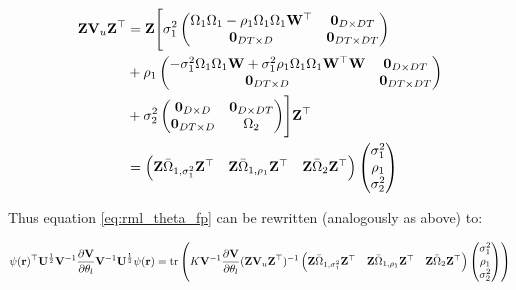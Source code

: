 \begin{align*}
\mathbf{Z}\mathbf{V}_u\mathbf{Z}^\top
&=\mathbf{Z}
\Biggr[
\sigma_1^2\left(\begin{matrix}
\Omega_1\Omega_1 -\rho_1\Omega_1\Omega_1\mathbf{W}^\top & \mathbf{0}_{D\times DT}\\
\mathbf{0}_{DT\times D} &  \mathbf{0}_{DT\times DT}
\end{matrix}\right)\\
&+\rho_1\left(\begin{matrix}
-\sigma_1^2\Omega_1\Omega_1\mathbf{W} + \sigma_1^2\rho_1\Omega_1\Omega_1\mathbf{W}^\top\mathbf{W} & \mathbf{0}_{D\times DT}\\
\mathbf{0}_{DT\times D} &  \mathbf{0}_{DT\times DT}
\end{matrix}\right)\\
&+\sigma_2^2\left(\begin{matrix}
\mathbf{0}_{D\times D} & \mathbf{0}_{D\times DT}\\
\mathbf{0}_{DT\times D} & \Omega_2
\end{matrix}\right)
\Biggr]
\mathbf{Z}^\top \\
&=\left(\begin{matrix}\mathbf{Z}\bar{\Omega}_{1, \sigma_1^2}\mathbf{Z}^\top & 
\mathbf{Z}\bar{\Omega}_{1, \rho_1}\mathbf{Z}^\top & \mathbf{Z}\bar{\Omega}_2\mathbf{Z}^\top\end{matrix}\right)
\left(\begin{matrix}
\sigma_1^2 \\
\rho_1 \\
\sigma_2^2
\end{matrix}\right)
\end{align*}

Thus equation \ref{eq:rml_theta_fp} can be rewritten (analogously as
above) to:

\begin{eqnarray*}
\psi(\mathbf{r})^\top\mathbf{U}^{\frac{1}{2}}\mathbf{V}^{-1}\frac{\partial\mathbf{V}}{\partial\theta_l}\mathbf{V}^{-1}\mathbf{U}^{\frac{1}{2}} \psi(\mathbf{r}) = \operatorname{tr}\left(K\mathbf{V}^{-1}\frac{\partial\mathbf{V}}{\partial\theta_l} (\mathbf{Z}\mathbf{V}_u\mathbf{Z}^\top)^{-1} \left(\begin{matrix}\mathbf{Z}\bar{\Omega}_{1, \sigma_1^2}\mathbf{Z}^\top & 
\mathbf{Z}\bar{\Omega}_{1, \rho_1}\mathbf{Z}^\top & \mathbf{Z}\bar{\Omega}_2\mathbf{Z}^\top\end{matrix}\right)
\left(\begin{matrix}
\sigma_1^2 \\
\rho_1 \\
\sigma_2^2
\end{matrix}\right)\right)
\end{eqnarray*}

